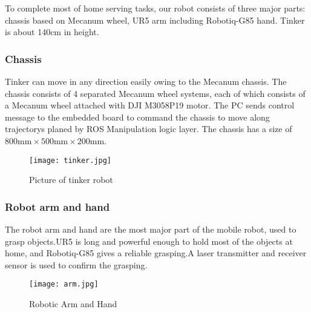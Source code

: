 To complete most of home serving tasks, our robot consists of three major parts: chassis based on Mecanum wheel, UR5 arm including Robotiq-G85 hand. Tinker is about 140cm in height. 
\subsubsection{Chassis}
Tinker can move in any direction easily owing to the Mecanum chassis. The chassis consists of 4 separated Mecanum wheel systems, each of which consists of a Mecanum wheel attached with DJI M3058P19 motor. The PC sends control message to the embedded board to command the chassis to move along trajectorys planed by ROS Manipulation logic layer. The chassis has a size of $800\text{mm} \times 500\text{mm}\times 200\text{mm}$.
\begin{figure}[!t]
\centering
\texttt{[image: tinker.jpg]}
    \caption{Picture of tinker robot}
\end{figure}

\subsubsection{Robot arm and hand}
The robot arm and hand are the most major part of the mobile robot, used to grasp objects.UR5 is long and powerful enough to hold most of the objects at home, and Robotiq-G85 gives a reliable grasping.A laser transmitter and receiver sensor is used to confirm the grasping.
\begin{figure*}[!t]
	\centering
    \texttt{[image: arm.jpg]}
    \caption{Robotic Arm and Hand}
\end{figure*}

